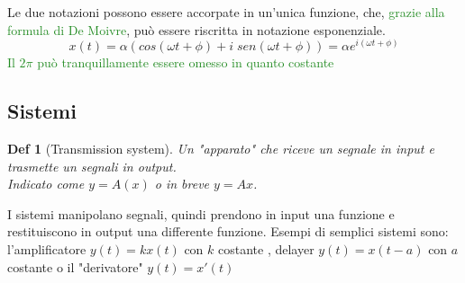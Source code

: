 \documentclass[a4paper]{article}
\newtheorem*{definition}{Def}
\newcommand{\appunto}[1]{\textcolor{ForestGreen}{#1}}
\begin{document}
Le due notazioni possono essere accorpate in un'unica funzione, che, \appunto{grazie alla formula di De Moivre}, può essere riscritta in notazione esponenziale.
$$x(t) = \alpha (cos(\omega t + \phi) + i \; sen ( \omega t + \phi)) = \alpha e^{i(\omega t + \phi)}$$
\appunto{Il $2 \pi$ può tranquillamente essere omesso in quanto costante}

\subsection{Sistemi}
\begin{definition}[Transmission system]
	Un "apparato" che riceve un segnale in input e trasmette un segnali in output.\\ Indicato come $y=A(x)$ o in breve $y=Ax$.
\end{definition}
I sistemi manipolano segnali, quindi prendono in input una funzione e restituiscono in output una differente funzione.
Esempi di semplici sistemi sono: l'amplificatore $y(t) = kx(t)$ con $k$ costante , delayer $y(t) = x(t-a)$ con $a$ costante o il "derivatore" $y(t) = x'(t)$
\end{document}
